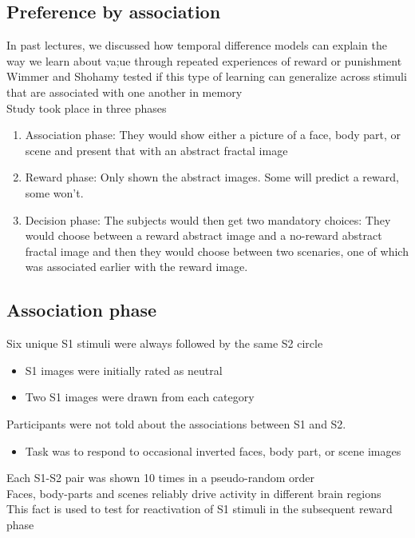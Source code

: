 \subsection{Preference by association}
In past lectures, we discussed how temporal difference models can explain the way we learn about va;ue through repeated experiences of reward or punishment
\\Wimmer and Shohamy tested if this type of learning can generalize across stimuli that are associated with one another in memory
\\Study took place in three phases
\begin{enumerate}
    \item Association phase: They would show either a picture of a face, body part, or scene and present that with an abstract fractal image
\item Reward phase: Only shown the abstract images. Some will predict a reward, some won't.
\item Decision phase: The subjects would then get two mandatory choices: They would choose between a reward abstract image and a no-reward abstract fractal image and then they would choose between two scenaries, one of which was associated earlier with the reward image.
\end{enumerate}
\subsection{Association phase}
Six unique S1 stimuli were always followed by the same S2 circle
\begin{itemize}
    \item S1 images were initially rated as neutral
    \item Two S1 images were drawn from each category
    
\end{itemize}
Participants were not told about the associations between S1 and S2.
\begin{itemize}
    \item Task was to respond to occasional inverted faces, body part, or scene images
\end{itemize}
Each S1-S2 pair was shown 10 times in a pseudo-random order
\\Faces, body-parts and scenes reliably drive activity in different brain regions
\\This fact is used to test for reactivation of S1 stimuli in the subsequent reward phase
